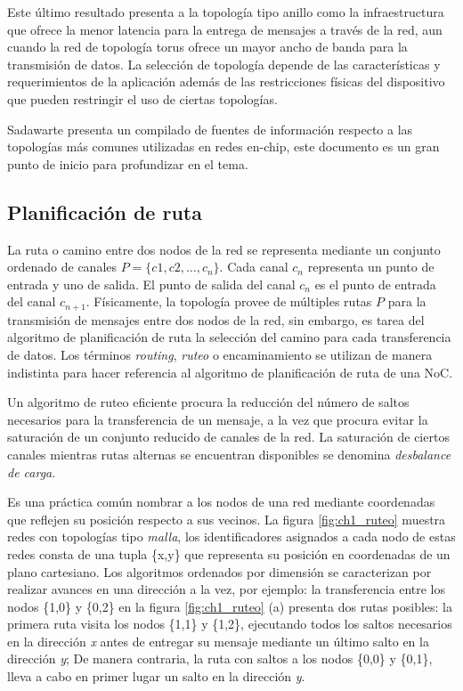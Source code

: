 Este último resultado presenta a la topología tipo anillo como la infraestructura que ofrece la menor latencia para la entrega de mensajes a través de la red, aun cuando la red de topología torus ofrece un mayor ancho de banda para la transmisión de datos. La selección de topología depende de las características y requerimientos de la aplicación además de las restricciones físicas del dispositivo que pueden restringir el uso de ciertas topologías.

Sadawarte\cite{chapter1:Sadawarte:2011:CSS:1947940.1947992} presenta  un compilado de fuentes de información respecto a las topologías más comunes utilizadas en redes en-chip, este documento es un gran punto de inicio para profundizar en el tema.




\subsection{Planificación de ruta}

La ruta o camino entre dos nodos de la red se representa mediante un conjunto ordenado de canales $P=\{c1, c2,\dots,c_{n}\}$. Cada canal $c_{n}$ representa un punto de entrada y uno de salida. El punto de salida del canal $c_{n}$ es el punto de entrada del canal $c_{n+1}$. Físicamente, la topología provee de múltiples rutas $P$ para la transmisión de mensajes entre dos nodos de la red, sin embargo, es tarea del algoritmo de planificación de ruta la selección del camino para cada transferencia de datos. Los términos \textit{routing}, \textit{ruteo} o encaminamiento se utilizan de manera indistinta para hacer referencia al algoritmo de planificación de ruta de una NoC.

Un algoritmo de ruteo eficiente procura la reducción del número de saltos necesarios para la transferencia de un mensaje, a la vez que procura evitar la saturación de un conjunto reducido de canales de la red. La saturación de ciertos canales mientras rutas alternas se encuentran disponibles se denomina \textit{desbalance de carga}.

Es una práctica común nombrar a los nodos de una red mediante coordenadas que reflejen su posición respecto a sus vecinos. La figura \ref{fig:ch1_ruteo} muestra redes con topologías tipo \textit{malla}, los identificadores asignados a cada nodo de estas redes consta de una tupla \{x,y\} que representa su posición en coordenadas de un plano cartesiano. Los algoritmos ordenados por dimensión se caracterizan por realizar avances en una dirección a la vez, por ejemplo: la transferencia entre los nodos \{1,0\} y \{0,2\} en la figura \ref{fig:ch1_ruteo} (a) presenta dos rutas posibles: la primera ruta visita los nodos \{1,1\} y \{1,2\}, ejecutando todos los saltos necesarios en la dirección \textit{x} antes de entregar su mensaje mediante un último salto en la dirección \textit{y}; De manera contraria, la ruta con saltos a los nodos \{0,0\} y \{0,1\}, lleva a cabo en primer lugar un salto en la dirección \textit{y}.

